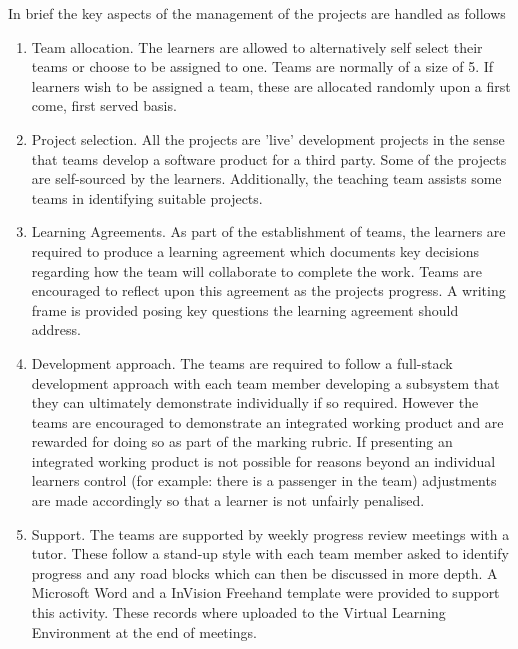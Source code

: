 \documentclass[sigconf, anonymous=true]{acmart}
\begin{document}
In brief the key aspects of the management of the projects are handled as follows
\begin{enumerate}
    \item {Team allocation.}
The learners are allowed to alternatively self select their teams or choose to be assigned to one. Teams are normally of a size of 5. If learners wish to be assigned a team, these are allocated randomly upon a first come, first served basis. 
\item {Project selection.}
All the projects are 'live' development projects in the sense that teams develop a software product for a third party. Some of the projects are self-sourced by the learners. Additionally, the teaching team assists some teams in identifying suitable projects. 
\item{Learning Agreements.}
As part of the establishment of teams, the learners are required to produce a learning agreement which documents key decisions regarding how the team will collaborate to complete the work. Teams are encouraged to reflect upon this agreement as the projects progress. A writing frame is provided posing key questions the learning agreement should address. 
\item{Development approach.}
The teams are required to follow a full-stack development approach with each team member developing a subsystem that they can ultimately demonstrate individually if so required. However the teams are encouraged to demonstrate an integrated working product and are rewarded for doing so as part of the marking rubric. If presenting an integrated working product is not possible for reasons beyond an individual learners control (for example: there is a passenger in the team) adjustments are made accordingly so that a learner is not unfairly penalised.
\item{Support.}
The teams are supported by weekly progress review meetings with a tutor. These  follow a stand-up style with each team member asked to identify progress and any road blocks which can then be discussed in more depth. A Microsoft Word and a InVision Freehand \cite{InVision} template were provided to support this activity. These records where uploaded to the Virtual Learning Environment at the end of  meetings.


\end{enumerate}
\end{document}
